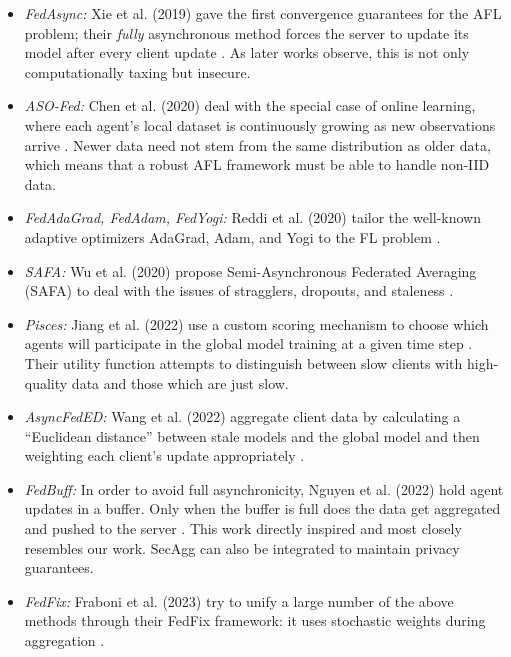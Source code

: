 \documentclass{article}
\begin{document}
\begin{itemize}[leftmargin=1em]
    \item \emph{FedAsync: }Xie et al. (2019) gave the first convergence guarantees for the AFL problem; their \emph{fully} asynchronous method forces the server to update its model after every client update \cite{xie2019asynchronous}. As later works observe, this is not only computationally taxing but insecure.
    \item \emph{ASO-Fed: }Chen et al. (2020) deal with the special case of online learning, where each agent's local dataset is continuously growing as new observations arrive \cite{chen2020asynchronous}. Newer data need not stem from the same distribution as older data, which means that a robust AFL framework must be able to handle non-IID data.
    \item \emph{FedAdaGrad, FedAdam, FedYogi: }Reddi et al. (2020) tailor the well-known adaptive optimizers AdaGrad, Adam, and Yogi to the FL problem \cite{reddi2020adaptive}. 
    \item \emph{SAFA: }Wu et al. (2020) propose Semi-Asynchronous Federated Averaging (SAFA) to deal with the issues of stragglers, dropouts, and staleness \cite{wu2020safa}.
    \item \emph{Pisces: }Jiang et al. (2022) use a custom scoring mechanism to choose which agents will participate in the global model training at a given time step \cite{jiang2022pisces}. Their utility function attempts to distinguish between slow clients with high-quality data and those which are just slow. 
    \item \emph{AsyncFedED: }Wang et al. (2022) aggregate client data by calculating a ``Euclidean distance'' between stale models and the global model and then weighting each client's update appropriately \cite{wang2022asyncfeded}.
    \item \emph{FedBuff: }In order to avoid full asynchronicity, Nguyen et al. (2022) hold agent updates in a buffer. Only when the buffer is full does the data get aggregated and pushed to the server \cite{nguyen2022federated}. This work directly inspired and most closely resembles our work. SecAgg \cite{bonawitz2016practical} \cite{guo2021secure} can also be integrated to maintain privacy guarantees. 
    \item \emph{FedFix: }Fraboni et al. (2023) try to unify a large number of the above methods through their FedFix framework: it uses stochastic weights during aggregation \cite{fraboni2023general}.
\end{itemize}
\end{document}
